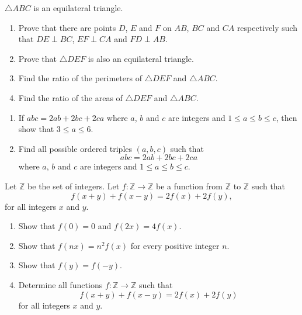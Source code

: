 \begin{problems}
    \problem $\triangle ABC$ is an equilateral triangle. 
    \begin{enumerate}
        \item Prove that there are points $D$, $E$ and $F$ on $AB$, $BC$ and
            $CA$ respectively such that $DE \perp BC$, $EF\perp CA$ and $FD
            \perp AB$. 

        \item Prove that $\triangle DEF$ is also an equilateral triangle.

        \item Find the ratio of the perimeters of $\triangle DEF$ and
            $\triangle ABC$.
        
        \item Find the ratio of the areas of $\triangle DEF$ and $\triangle
            ABC$. 
    \end{enumerate}
    
    \problem
    \begin{enumerate}
        \item If $abc = 2ab + 2bc +2ca$ where $a$, $b$ and $c$ are integers and
            $1 \leq a \leq b \leq c$, then show that $3 \leq a \leq 6$.
        
        \item Find all possible ordered triples $(a,b,c)$ such that \[abc = 2ab
            + 2bc + 2ca\] where $a$, $b$ and $c$ are integers and $1 \leq a
            \leq b \leq c$. 
    \end{enumerate}
    
    \problem Let $\mathbb{Z}$ be the set of integers. Let $f:\mathbb{Z}
    \rightarrow \mathbb{Z}$ be a function from $\mathbb{Z}$ to $\mathbb{Z}$
    such that 
    \[f(x + y) + f(x - y) = 2f(x) + 2f(y),\]
    for all integers $x$ and $y$. 
    \begin{enumerate}
        \item Show that $f(0) = 0$ and $f(2x) = 4f(x)$. 
        
        \item Show that $f(nx) = n^2f(x)$ for every positive integer $n$. 
        
        \item Show that $f(y) = f(-y)$. 
        
        \item Determine all functions $f:\mathbb{Z} \rightarrow \mathbb{Z}$
            such that 
            \[f(x + y) + f(x - y) = 2f(x) + 2f(y)\] 
            for all integers $x$ and $y$. 
    \end{enumerate}
    

\end{problems}
